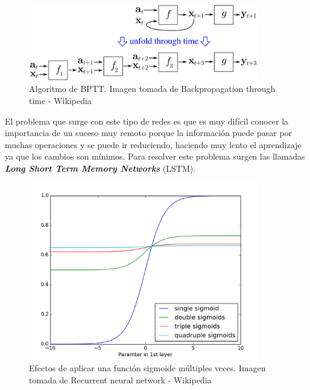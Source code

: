 \documentclass[12pt,spanish]{article}
\begin{document}
	\begin{figure}[H]
		\centering
		\includegraphics[width=10cm]{Imagenes/bptt.png}
		\begin{centering}
			\caption{Algoritmo de BPTT. Imagen tomada de Backpropagation through time - Wikipedia}
		\end{centering}
	\end{figure}
	El problema que surge con este tipo de redes es que es muy difícil conocer la importancia de un suceso muy remoto porque la información puede pasar por muchas operaciones y se puede ir reduciendo, haciendo muy lento el aprendizaje ya que los cambios son mínimos. Para resolver este problema surgen las llamadas \textbf{\textit{Long Short Term Memory Networks}} (LSTM).
	\begin{figure}[H]
		\centering
		\includegraphics[width=10cm]{Imagenes/sigmoid_vanishing_gradient.png}
		\begin{centering}
			\caption{Efectos de aplicar una función sigmoide múltiples veces. Imagen tomada de Recurrent neural network - Wikipedia}
		\end{centering}
	\end{figure}
\end{document}
